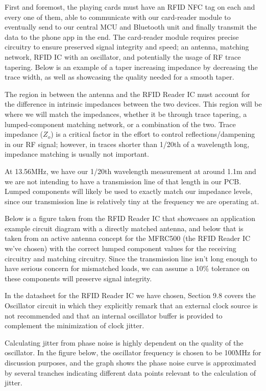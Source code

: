 \documentclass[12pt]{article}
\begin{document}
First and foremost, the playing cards must have an RFID NFC tag on each and every one of them, able to communicate with our card-reader module to eventually send to our central MCU and Bluetooth unit and finally transmit the data to the phone app in the end. The card-reader module requires precise circuitry to ensure preserved signal integrity and speed; an antenna, matching network, RFID IC with an oscillator, and potentially the usage of RF trace tapering. Below is an example of a taper increasing impedance by decreasing the trace width, as well as showcasing the quality needed for a smooth taper.

The region in between the antenna and the RFID Reader IC must account for the difference in intrinsic impedances between the two devices. This region will be where we will match the impedances, whether it be through trace tapering, a lumped-component matching network, or a combination of the two. Trace impedance ($Z_o$) is a critical factor in the effort to control reflections/dampening in our RF signal; however, in traces shorter than 1/20th of a wavelength long, impedance matching is usually not important. 

At 13.56MHz, we have our 1/20th wavelength measurement at around 1.1m and we are not intending to have a transmission line of that length in our PCB. Lumped components will likely be used to exactly match our impedance levels, since our transmission line is relatively tiny at the frequency we are operating at. 

Below is a figure taken from the RFID Reader IC that showcases an application example circuit diagram with a directly matched antenna, and below that is taken from an active antenna concept for the MFRC500 (the RFID Reader IC we've chosen) with the correct lumped component values for the receiving circuitry and matching circuitry. Since the transmission line isn't long enough to have serious concern for mismatched loads, we can assume a 10\% tolerance on these components will preserve signal integrity.

In the datasheet for the RFID Reader IC we have chosen, Section 9.8 covers the Oscillator circuit in which they explicitly remark that an external clock source is not recommended and that an internal oscillator buffer is provided to complement the minimization of clock jitter. 

Calculating jitter from phase noise is highly dependent on the quality of the oscillator. In the figure below, the oscillator frequency is chosen to be 100MHz for discussion purposes, and the graph shows the phase noise curve is approximated by several tranches indicating different data points relevant to the calculation of jitter.
\end{document}
